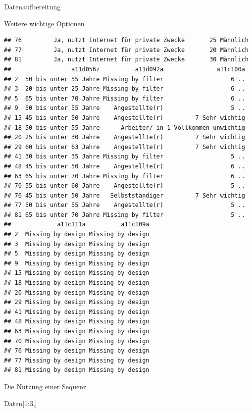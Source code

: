 \documentclass[ignorenonframetext,]{beamer}
\newenvironment{Shaded}{}{}
\newcommand{\DecValTok}[1]{\textcolor[rgb]{0.25,0.63,0.44}{{#1}}}
\newcommand{\NormalTok}[1]{{#1}}
\begin{document}
\begin{frame}[fragile]{Datenaufbereitung}
\begin{block}{Weitere wichtige Optionen}
\begin{verbatim}
## 76         Ja, nutzt Internet für private Zwecke       25 Männlich
## 77         Ja, nutzt Internet für private Zwecke       20 Männlich
## 81         Ja, nutzt Internet für private Zwecke       30 Männlich
##                 a11d056z          a11d092a               a11c100a
## 2  50 bis unter 55 Jahre Missing by filter                   6 ..
## 3  20 bis unter 25 Jahre Missing by filter                   6 ..
## 5  65 bis unter 70 Jahre Missing by filter                   6 ..
## 9  50 bis unter 55 Jahre    Angestellte(r)                   5 ..
## 15 45 bis unter 50 Jahre    Angestellte(r)         7 Sehr wichtig
## 18 50 bis unter 55 Jahre      Arbeiter/-in 1 Vollkommen unwichtig
## 20 25 bis unter 30 Jahre    Angestellte(r)         7 Sehr wichtig
## 29 60 bis unter 63 Jahre    Angestellte(r)         7 Sehr wichtig
## 41 30 bis unter 35 Jahre Missing by filter                   5 ..
## 48 45 bis unter 50 Jahre    Angestellte(r)                   6 ..
## 63 65 bis unter 70 Jahre Missing by filter                   6 ..
## 70 55 bis unter 60 Jahre    Angestellte(r)                   5 ..
## 76 45 bis unter 50 Jahre   Selbstständiger         7 Sehr wichtig
## 77 50 bis unter 55 Jahre    Angestellte(r)                   5 ..
## 81 65 bis unter 70 Jahre Missing by filter                   5 ..
##             a11c111a          a11c109a
## 2  Missing by design Missing by design
## 3  Missing by design Missing by design
## 5  Missing by design Missing by design
## 9  Missing by design Missing by design
## 15 Missing by design Missing by design
## 18 Missing by design Missing by design
## 20 Missing by design Missing by design
## 29 Missing by design Missing by design
## 41 Missing by design Missing by design
## 48 Missing by design Missing by design
## 63 Missing by design Missing by design
## 70 Missing by design Missing by design
## 76 Missing by design Missing by design
## 77 Missing by design Missing by design
## 81 Missing by design Missing by design
\end{verbatim}

\end{block}

\begin{block}{Die Nutzung einer Sequenz}

\begin{Shaded}
\begin{Highlighting}[]
\NormalTok{Daten[}\DecValTok{1}\NormalTok{:}\DecValTok{3}\NormalTok{,]}
\end{Highlighting}
\end{Shaded}


\end{block}
\end{frame}
\end{document}
